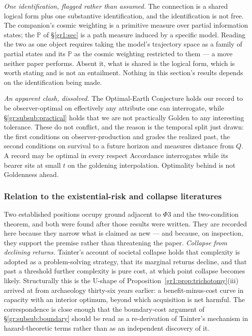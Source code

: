 \documentclass[11pt]{article}
\numberwithin{equation}{section}
\theoremstyle{plain}
\theoremstyle{definition}
\theoremstyle{remark}
\newcommand{\PP}{\mathbb{P}}
\begin{document}
\emph{One identification, flagged rather than assumed.} The connection
is a shared logical form plus one substantive identification, and the
identification is not free. The companion's cosmic weighting is a
primitive measure over partial information states; the $\PP$ of
\S\ref{gr1:sec} is a path measure induced by a
specific model. Reading the two as one object requires taking the
model's trajectory space as a family of partial states and its $\PP$ as
the cosmic weighting restricted to them --- a move neither paper
performs. Absent it, what is shared is the logical form, which is worth
stating and is not an entailment. Nothing in this section's results
depends on the identification being made.

\emph{An apparent clash, dissolved.} The Optimal-Earth Conjecture
\cite{Ben26Optimal} holds our record to be observer-optimal on
effectively any attribute one can interrogate, while \S\ref{gr:subsub:practical} holds
that we are not practically Golden to any interesting tolerance. These
do not conflict, and the reason is the temporal split just drawn: the
first conditions on observer-production and grades the realized past,
the second conditions on survival to a future horizon and measures
distance from $Q$. A record may be optimal in every respect Accordance
interrogates while its bearer sits at small $t$ on the goldening
interpolation. Optimality behind is not Goldenness ahead.

\subsubsection{Relation to the existential-risk and collapse
literatures}\label{gr:subsub:xrisk}

Two established positions occupy ground adjacent to $\Phi3$ and the
two-condition theorem, and both were found after those results were
written. They are recorded here because they narrow what is claimed as
new --- and because, on inspection, they support the premise rather than
threatening the paper. \emph{Collapse from declining returns.} Tainter's account of societal
collapse \cite{Tainter88} holds that complexity is adopted as a
problem-solving strategy, that its marginal returns decline, and that
past a threshold further complexity is pure cost, at which point
collapse becomes likely. Structurally this is the U-shape of
Proposition~\ref{gr1:prop:trichotomy}(iii) arrived at from archaeology
thirty-six years earlier: a benefit-minus-cost curve in capacity with an
interior optimum, beyond which acquisition is net harmful. The
correspondence is close enough that the boundary-cost argument of
\S\ref{gr:subsub:boundary} should be read as a re-derivation of
Tainter's mechanism in hazard-theoretic terms rather than as an
independent discovery of it.
\end{document}
